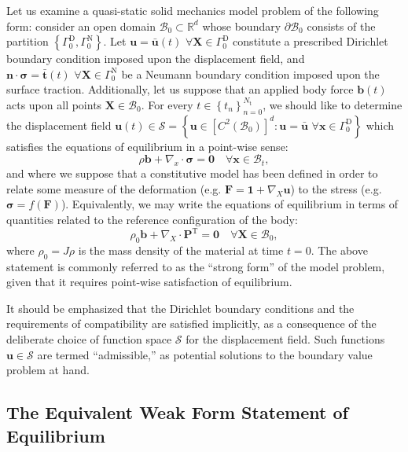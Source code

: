 Let us examine a quasi-static solid mechanics model problem of the following form: consider an open domain $\mathcal{B}_0 \subset \mathbb{R}^d$ whose boundary $\partial \mathcal{B}_0$ consists of the partition $\left\{ \Gamma^{\mathrm D}_0, \Gamma^{\mathrm N}_0 \right\}$. Let $\bm{u} = \bar{\bm{u}}(t) \, \, \forall \bm{X} \in \Gamma^{\mathrm D}_0$ constitute a prescribed Dirichlet boundary condition imposed upon the displacement field, and $\bm{n} \cdot \boldsymbol{\sigma} = \bar{\bm{t}}(t) \, \, \forall \bm{X} \in \Gamma^{\mathrm N}_0$ be a Neumann boundary condition imposed upon the surface traction. Additionally, let us suppose that an applied body force $\bm{b}(t)$ acts upon all points $\bm{X} \in \mathcal{B}_0$. For every $t \in \left\{ t_n \right\}_{n=0}^{N_{\mathrm t}}$, we should like to determine the displacement field $\bm{u} (t) \in \mathcal{S} = \left\{ \bm{u} \in \left[ C^2 (\mathcal{B}_0) \right]^d \colon \bm{u} = \bar{\bm{u}} \, \, \forall \bm{x} \in \Gamma^{\mathrm D}_0 \right\}$ which satisfies the equations of equilibrium in a point-wise sense:
\begin{equation}
  \rho \bm{b} + \nabla_x \cdot \boldsymbol{\sigma} = \bm{0} \quad \forall \bm{x} \in \mathcal{B}_{t},
\end{equation}
and where we suppose that a constitutive model has been defined in order to relate some measure of the deformation (e.g. $\bm{F} = \bm{1} + \nabla_X \bm{u}$) to the stress (e.g. $\boldsymbol{\sigma} = f (\bm{F})$). Equivalently, we may write the equations of equilibrium in terms of quantities related to the reference configuration of the body:
\begin{equation}
  \rho_0 \bm{b} + \nabla_X \cdot \bm{P}^{\mathrm T} = \bm{0} \quad \forall \bm{X} \in \mathcal{B}_0,
\end{equation}
where $\rho_0 = J \rho$ is the mass density of the material at time $t = 0$. The above statement is commonly referred to as the ``strong form'' of the model problem, given that it requires point-wise satisfaction of equilibrium.

It should be emphasized that the Dirichlet boundary conditions and the requirements of compatibility are satisfied implicitly, as a consequence of the deliberate choice of function space $\mathcal{S}$ for the displacement field. Such functions $\bm{u} \in \mathcal{S}$ are termed ``admissible,'' as potential solutions to the boundary value problem at hand.

\subsection*{The Equivalent Weak Form Statement of Equilibrium}

